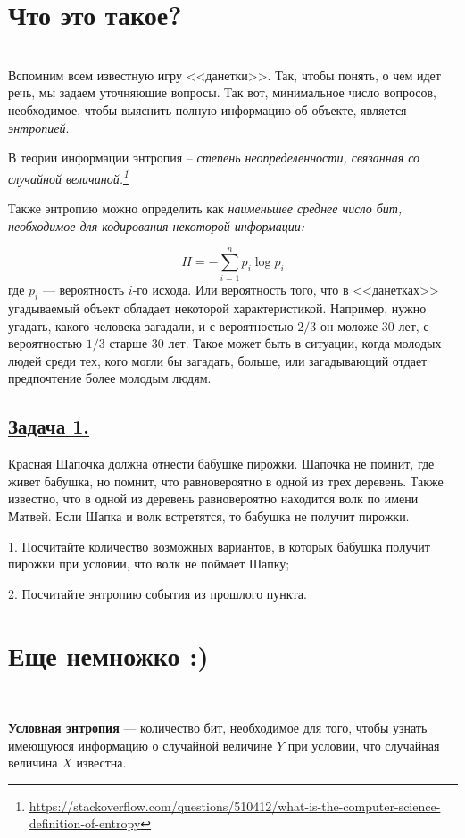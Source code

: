 \section*{Что это такое?}~\
\\ 

Вспомним всем известную игру <<данетки>>. Так, чтобы понять, о чем идет речь, мы задаем уточняющие вопросы. Так вот, минимальное число вопросов, необходимое, чтобы выяснить полную информацию об объекте, является \textit{энтропией}.

В теории информации энтропия -- \textit{степень неопределенности, связанная со случайной величиной.\footnote{\url{https://stackoverflow.com/questions/510412/what-is-the-computer-science-definition-of-entropy}}}

Также энтропию можно определить как \textit{наименьшее среднее число бит, необходимое для кодирования некоторой информации:}

\[H=-\sum\limits_{i=1}^n p_i\log p_i \]
где $p_i$ --- вероятность $i$-го исхода. Или вероятность того, что в <<данетках>> угадываемый объект обладает некоторой характеристикой. Например, нужно угадать, какого человека загадали, и с вероятностью $2/3$ он моложе 30 лет, с вероятностью $1/3$ старше 30 лет. Такое может быть в ситуации, когда молодых людей среди тех, кого могли бы загадать, больше, или загадывающий отдает предпочтение более молодым людям. 

\subsection*{\hyperref[sec:sol_problem1]{Задача 1.}}\label{sec:problem1} 
Красная Шапочка должна отнести бабушке пирожки. Шапочка не помнит, где живет бабушка, но помнит, что равновероятно в одной из трех деревень. Также известно, что в одной из деревень равновероятно находится волк по имени Матвей. Если Шапка и волк встретятся, то бабушка не получит пирожки. 

1. Посчитайте количество возможных вариантов, в которых бабушка получит пирожки при условии, что волк не поймает Шапку; 

2. Посчитайте энтропию события из прошлого пункта. 

\section*{Еще немножко :)}~\
\\

\begin{siderules}
    \textbf{Условная энтропия} --- количество бит, необходимое для того, чтобы узнать имеющуюся информацию о случайной величине $Y$ при условии, что случайная величина $X$ известна.
\end{siderules}

